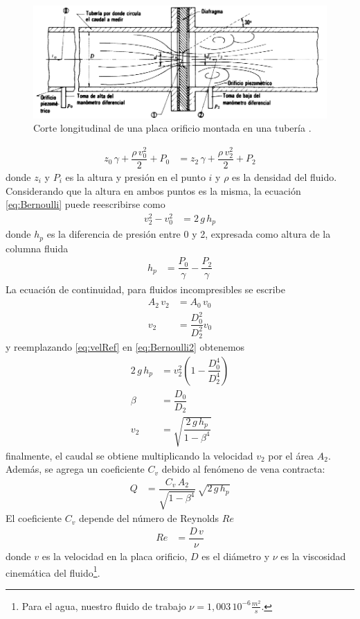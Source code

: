 \begin{figure}
 \centering
\includegraphics[width=\textwidth]{Cap2-DisenoEnsamblado/images/placaOrif.png}
\caption{Corte longitudinal de una placa orificio montada en una tubería
\cite{bib:Mataix}.}
 \label{fig:placaOrificio}
\end{figure}

\begin{align}
 z_0 \, \gamma + \dfrac{\rho \,v_0^2}{2} + P_0 &= z_2 \, \gamma + \dfrac{\rho
\,v_2^2}{2} + P_2
\label{eq:Bernoulli}
\end{align}
donde $z_i$ y $P_i$ es la altura y presión en el punto $i$ y $\rho$ es 
la densidad del fluido. 
Considerando que la altura en ambos puntos es la misma, la ecuación
\eqref{eq:Bernoulli} puede reescribirse como
\begin{align}
 v_2^2 - v_0^2 &= 2\,g\,h_p
 \label{eq:Bernoulli2}
\end{align}
donde $h_p$ es la diferencia de presión entre 0 y 2, expresada como
altura de la columna fluida
\begin{align}
 h_p &= \dfrac{P_0}{\gamma}-\dfrac{P_2}{\gamma}
\end{align}
La ecuación de continuidad, para fluidos incompresibles se escribe
\begin{align}
 A_2\,v_2 &= A_0\,v_0 \\
 v_2 &= \dfrac{D_0^2}{D_2^2} v_0
 \label{eq:velRef}
\end{align}
y reemplazando \eqref{eq:velRef} en \eqref{eq:Bernoulli2} obtenemos
\begin{align}
 2 \, g \, h_p &= v_2^2 \left( 1 - \dfrac{D_0^4}{D_2^4} \right)\\
 \beta &= \dfrac{D_0}{D_2}\\
 v_2 &= \sqrt{\dfrac{2 \, g \, h_p}{1-\beta^4}}
\end{align}
finalmente, el caudal se obtiene multiplicando la velocidad $v_2$ por el
área $A_2$.
Además, se agrega un coeficiente $C_v$ debido al fenómeno de vena contracta:
\begin{align}
 Q &= \dfrac{C_v \, A_2}{\sqrt{1-\beta^4}}\, \sqrt{2 \, g \, h_p}
 \label{eq:placaOrif1}
\end{align}
El coeficiente $C_v$ depende del número de Reynolds $Re$
\cite{bib:Mataix, bib:ApuntesPuglesiPlacaOrif}
\begin{align}
Re &= \dfrac{D\,v}{\nu}
\end{align}
donde $v$ es la velocidad en la placa orificio, $D$ es el diámetro y ${\nu}$
es la viscosidad cinemática del fluido\footnote{Para el agua, nuestro fluido de
trabajo $\nu = 1,003\,10^{-6} \frac{m^2}{s}$.}.

